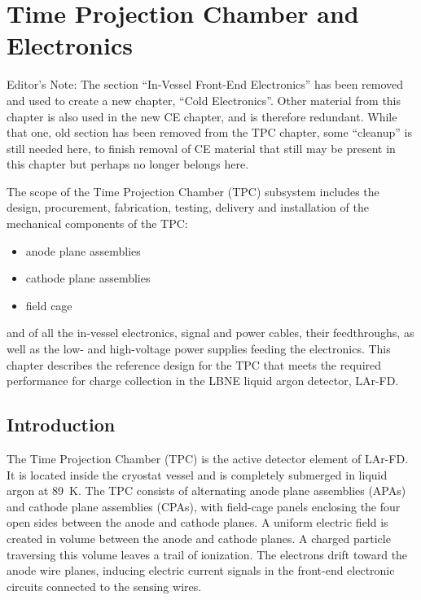 \chapter{Time Projection Chamber and Electronics }
\label{ch:tpc}

\begin{editornote}
  Editor's Note:  The section ``In-Vessel Front-End Electronics'' has been removed and used to create a new chapter,
``Cold Electronics''.
Other material from this chapter is also used in the new CE chapter, and is therefore redundant.
While that one, old section has been removed from the TPC chapter, some ``cleanup'' is still needed here,
to finish removal of CE material that still may be present in this chapter but perhaps no longer belongs here.
\end{editornote}


The scope of the Time Projection Chamber (TPC) subsystem includes the design, procurement, fabrication, testing, delivery and installation of the mechanical components of the TPC: 
\begin{itemize}
\item anode plane assemblies 
\item cathode plane assemblies
\item field cage
\end{itemize}
and of all the in-vessel electronics, signal and power cables, their feedthroughs, as well as the 
low- and high-voltage power supplies feeding the electronics.  This chapter describes the reference design for the TPC that meets the required performance for charge collection in the LBNE liquid argon detector, LAr-FD.

\section{Introduction}

The Time Projection Chamber (TPC) is the active detector element of LAr-FD. It is located inside the cryostat 
vessel and is completely submerged in liquid argon at 89~K. The TPC consists of alternating anode plane assemblies (APAs) and cathode plane assemblies (CPAs), with field-cage panels enclosing the four open sides between the anode and cathode planes.
A uniform electric field is created in volume between the anode and cathode planes. A charged particle traversing this volume leaves a trail of ionization.  The electrons drift toward the anode wire planes, inducing electric current signals in the front-end electronic circuits connected to the sensing wires.

